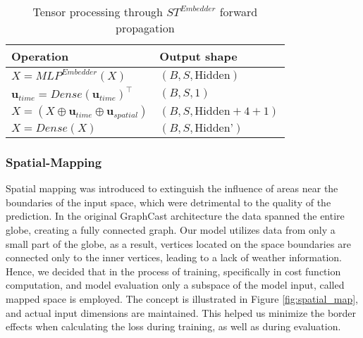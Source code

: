 \begin{table}[!ht]
    \centering
    \begin{tabular}{|l|l|}
        \hline
        \textbf{Operation} & \textbf{Output shape} \\
        \hline
        $X = MLP^{Embedder}(X)$ & $(B, S, \text{Hidden})$ \\
        $\mathbf{u}_{time} = Dense(\mathbf{u}_{time})^{\top}$ & $(B, S, 1)$ \\
        $X = (X \oplus \mathbf{u}_{time} \oplus \mathbf{u}_{spatial})$ & $(B, S, \text{Hidden} + 4 + 1)$ \\
        $X = Dense(X)$ & $(B, S, \text{Hidden'})$ \\
        \hline
    \end{tabular}
    \caption{Tensor processing through $ST^{Embedder}$ forward propagation  }
    \label{tab:st_embed}
\end{table}

\subsubsection{Spatial-Mapping} \label{spatialmapping}
Spatial mapping was introduced to extinguish the influence of areas near the boundaries of the input space, which were detrimental to the quality of the prediction. In the original GraphCast architecture
the data spanned the entire globe, creating a fully connected graph. Our model utilizes data from only a small part of the globe, as a result, vertices located on the space boundaries are connected only to the inner vertices, leading to a lack of weather information. Hence, we decided that in the process of training, specifically in cost function computation, and model evaluation only a subspace of the model input, called mapped space is employed. The concept is illustrated in Figure \ref{fig:spatial_map}, and actual input dimensions are maintained. This helped us minimize the border effects when calculating the loss during training, as well as during evaluation.

 